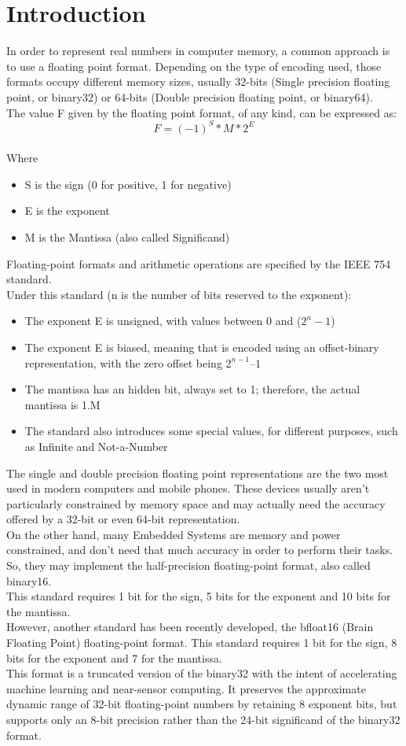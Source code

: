 \documentclass[12pt]{article}
\begin{document}
\section{Introduction}
In order to represent real numbers in computer memory, a common approach is to use a floating point format. Depending on the type of encoding used, those formats occupy different memory sizes, usually 32-bits (Single precision floating point, or binary32) or 64-bits (Double precision floating point, or binary64). \\
The value F given by the floating point format, of any kind, can be expressed as:
$$F = (-1)^{S}*M*2^{E} $$
\\
Where 
\begin{itemize}
\item S is the sign (0 for positive, 1 for negative)
\item E is the exponent
\item M is the Mantissa (also called Significand)
\end{itemize}
Floating-point formats and arithmetic operations are specified by the IEEE 754 standard. \\
Under this standard (n is the number of bits reserved to the exponent):
\begin{itemize}
\item The exponent E is unsigned, with values between 0 and ($2^{n} -1$)
\item	The exponent E is biased, meaning that is encoded using an offset-binary representation, with the zero offset being $2^{n-1} – 1$
\item	The mantissa has an hidden bit, always set to 1; therefore, the actual mantissa is 1.M
\item	The standard also introduces some special values, for different purposes, such as Infinite and Not-a-Number
\end{itemize}

The single and double precision floating point representations are the two most used in modern computers and mobile phones. These devices usually aren’t particularly constrained by memory space and may actually need the accuracy offered by a 32-bit or even 64-bit representation.\\
On the other hand, many Embedded Systems are memory and power constrained, and don’t need that much accuracy in order to perform their tasks. So, they may implement the half-precision floating-point format, also called binary16. \\
This standard requires 1 bit for the sign, 5 bits for the exponent and 10 bits for the mantissa. \\
However, another standard has been recently developed, the bfloat16 (Brain Floating Point) floating-point format. This standard requires 1 bit for the sign, 8 bits for the exponent and 7 for the mantissa. \\
This format is a truncated version of the binary32 with the intent of accelerating machine learning and near-sensor computing. It preserves the approximate dynamic range of 32-bit floating-point numbers by retaining 8 exponent bits, but supports only an 8-bit precision rather than the 24-bit significand of the binary32 format. 
\end{document}
